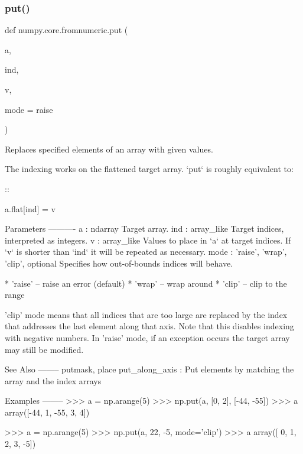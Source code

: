  \mbox{\label{namespacenumpy_1_1core_1_1fromnumeric_a649171e48bffb666b01e07b9687937fc}} 
\subsubsection{\texorpdfstring{put()}{put()}}
{\footnotesize\ttfamily def numpy.\+core.\+fromnumeric.\+put (\begin{DoxyParamCaption}\item[{}]{a,  }\item[{}]{ind,  }\item[{}]{v,  }\item[{}]{mode = {\ttfamily \textquotesingle{}raise\textquotesingle{}} }\end{DoxyParamCaption})}

\begin{DoxyVerb}Replaces specified elements of an array with given values.

The indexing works on the flattened target array. `put` is roughly
equivalent to:

::

    a.flat[ind] = v

Parameters
----------
a : ndarray
    Target array.
ind : array_like
    Target indices, interpreted as integers.
v : array_like
    Values to place in `a` at target indices. If `v` is shorter than
    `ind` it will be repeated as necessary.
mode : {'raise', 'wrap', 'clip'}, optional
    Specifies how out-of-bounds indices will behave.

    * 'raise' -- raise an error (default)
    * 'wrap' -- wrap around
    * 'clip' -- clip to the range

    'clip' mode means that all indices that are too large are replaced
    by the index that addresses the last element along that axis. Note
    that this disables indexing with negative numbers. In 'raise' mode,
    if an exception occurs the target array may still be modified.

See Also
--------
putmask, place
put_along_axis : Put elements by matching the array and the index arrays

Examples
--------
>>> a = np.arange(5)
>>> np.put(a, [0, 2], [-44, -55])
>>> a
array([-44,   1, -55,   3,   4])

>>> a = np.arange(5)
>>> np.put(a, 22, -5, mode='clip')
>>> a
array([ 0,  1,  2,  3, -5])\end{DoxyVerb}
 \mbox{\label{namespacenumpy_1_1core_1_1fromnumeric_aa305b3df2875409e87875b0614c16936}} 
